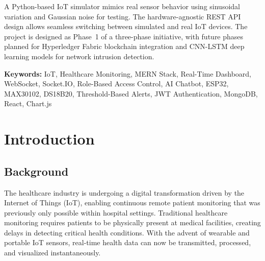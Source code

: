 \documentclass[12pt,a4paper]{report}
\begin{document}
\vspace{0.4cm}
A Python-based IoT simulator mimics real sensor behavior using sinusoidal variation and Gaussian noise for testing. The hardware-agnostic REST API design allows seamless switching between simulated and real IoT devices. The project is designed as Phase~1 of a three-phase initiative, with future phases planned for Hyperledger Fabric blockchain integration and CNN-LSTM deep learning models for network intrusion detection.

\vspace{0.8cm}
\noindent\textbf{Keywords:} IoT, Healthcare Monitoring, MERN Stack, Real-Time Dashboard, WebSocket, Socket.IO, Role-Based Access Control, AI Chatbot, ESP32, MAX30102, DS18B20, Threshold-Based Alerts, JWT Authentication, MongoDB, React, Chart.js


\tableofcontents
\newpage

\listoffigures
\newpage

\listoftables
\newpage

\chapter{Introduction}

\section{Background}
The healthcare industry is undergoing a digital transformation driven by the Internet of Things (IoT), enabling continuous remote patient monitoring that was previously only possible within hospital settings. Traditional healthcare monitoring requires patients to be physically present at medical facilities, creating delays in detecting critical health conditions. With the advent of wearable and portable IoT sensors, real-time health data can now be transmitted, processed, and visualized instantaneously.
\end{document}
